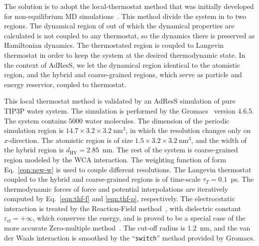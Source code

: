 \documentclass[epjST]{svjour}
\newcommand{\HY}[0]{\textrm{HY}}
\begin{document}
The solution is to adopt the local-thermostat method that was initially
developed for non-equilibrium MD simulations~\cite{wang2014exploring}.
This method divide the system in to two regions.
The dynamical region of out of which the dynamical properties are calculated is not coupled
to any thermostat, so the dynamics there is preserved as Hamiltonian dynamics.
The thermostated region is coupled to Langevin thermostat in order to keep the system
at the desired thermodynamic state.
In the context of AdResS, we let the dynamical region identical to the atomistic region,
and
the hybrid and coarse-grained regions, which serve as particle and energy reservior, coupled to thermostat.

This local thermostat method is validated by an AdResS simulation of pure TIP3P
water system.
The simulation is performed by the Gromacs~\cite{pronk2013gromacs} version 4.6.5.
The system contains 5000 water molecules.  The dimension of the periodic
simulation region is $14.7\times3.2\times3.2~\textrm{nm}^3$,
in which the resolution changes only on $x$-direction.
The atomistic region is of size $1.5\times3.2\times3.2~\textrm{nm}^3$, and the width of the hybrid region is $d_{\HY} = 2.85$~nm.
The rest of the system is coarse-grained region modeled by the WCA interaction.
The weighting function of form Eq.~\eqref{eqn:new-w} is used to couple different resolutions.
The Langevin thermostat coupled to the hybrid and coarse-grained regions is of time-scale $\tau_T = 0.1$~ps.
The thermodynamic forces of force and potential interpolations are iteratively computed by
Eq.~\eqref{eqn:thf-f} and \eqref{eqn:thf-p}, respectively.
The electrocstatic interaction is treated by the Reaction-Field method~\cite{onsager1936electric,tironi1995generalized},
with dielectric constant $\varepsilon_{\textrm{rf}} = +\infty$, which conserves the energy, and
is proved to be a special case of the more
accurate Zero-multiple method~\cite{fukuda2011molecular,fukuda2013zero}.
The cut-off radius is 1.2~nm, and the van der Waals interaction is smoothed by the ``\texttt{switch}'' method provided by
Gromacs.
\end{document}
